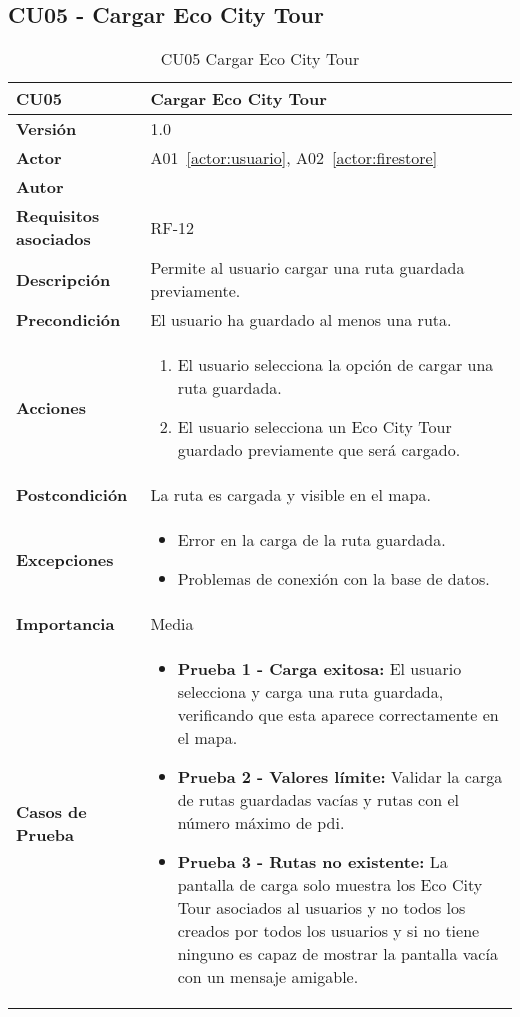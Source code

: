 \subsection{CU05 - Cargar Eco City Tour}
\begin{table}[H]
	\centering
	\begin{tabularx}{\linewidth}{ p{} p{} }
		\toprule
		\textbf{CU05}    & \textbf{Cargar Eco City Tour} \\
		\toprule
		\textbf{Versión}              & 1.0    \\
		\textbf{Actor}                & A01~\ref{actor:usuario}, A02~\ref{actor:firestore} \\
		\textbf{Autor}                & \autor \\
		\textbf{Requisitos asociados} & RF-12 \\
		\textbf{Descripción}          & Permite al usuario cargar una ruta guardada previamente. \\
		\textbf{Precondición}         & El usuario ha guardado al menos una ruta. \\
		\textbf{Acciones}             &
		\begin{enumerate}
			\def\labelenumi{\arabic{enumi}.}
			\tightlist
			\item El usuario selecciona la opción de cargar una ruta guardada.
			\item El usuario selecciona un Eco City Tour guardado previamente que será cargado.
		\end{enumerate}\\
		\textbf{Postcondición}        & La ruta es cargada y visible en el mapa. \\
		\textbf{Excepciones}          & 
		\begin{itemize}
			\tightlist
			\item Error en la carga de la ruta guardada.
			\item Problemas de conexión con la base de datos.
		\end{itemize}\\
		\textbf{Importancia}          & Media \\
		\textbf{Casos de Prueba}      &
		\begin{itemize}
			\item \textbf{Prueba 1 - Carga exitosa:} El usuario selecciona y carga una ruta guardada, verificando que esta aparece correctamente en el mapa.
			\vspace{2pt}
			\item \textbf{Prueba 2 - Valores límite:} Validar la carga de rutas guardadas vacías y rutas con el número máximo de \acrshort{pdi}.
			\vspace{2pt}
			\item \textbf{Prueba 3 - Rutas no existente:} La pantalla de carga solo muestra los Eco City Tour asociados al usuarios y no todos los creados por todos los usuarios y si no tiene ninguno es capaz de mostrar la pantalla vacía con un mensaje amigable.
		\end{itemize} \\
		\bottomrule
	\end{tabularx}
	\caption{CU05 Cargar Eco City Tour}
	\label{cu:cargar-tour}
\end{table}


